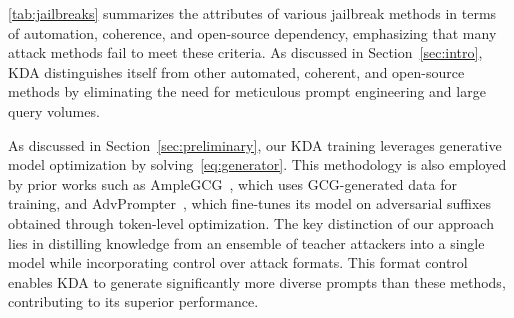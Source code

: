 \autoref{tab:jailbreaks} summarizes the attributes of various jailbreak methods in terms of automation, coherence, and open-source dependency, emphasizing that many attack methods fail to meet these criteria. As discussed in Section~\ref{sec:intro}, KDA distinguishes itself from other automated, coherent, and open-source methods by eliminating the need for meticulous prompt engineering and large query volumes. 






As discussed in Section~\ref{sec:preliminary}, our KDA training leverages generative model optimization by solving~\autoref{eq:generator}. This methodology is also employed by prior works such as AmpleGCG~\citep{liao_amplegcg_2024}, which uses GCG-generated data for training, and AdvPrompter~\citep{paulus_advprompter_2024}, which fine-tunes its model on adversarial suffixes obtained through token-level optimization. The key distinction of our approach lies in distilling knowledge from an ensemble of teacher attackers into a single model while incorporating control over attack formats. This format control enables KDA to generate significantly more diverse prompts than these methods, contributing to its superior performance.







